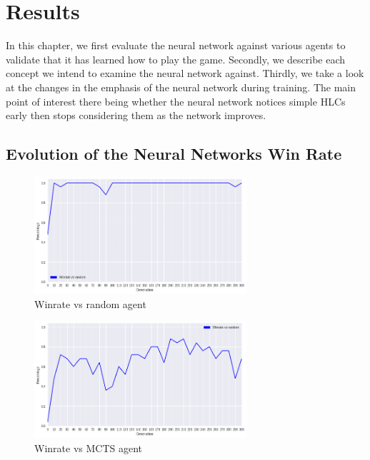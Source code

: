 \chapter{Results}

\label{cha:results}

In this chapter, we first evaluate the neural network against various agents to validate that it has learned how to play the game. Secondly, we describe each concept we intend to examine the neural network against. Thirdly, we take a look at the changes in the emphasis of the neural network during training. The main point of interest there being whether the neural network notices simple HLCs early then stops considering them as the network improves.

\section{Evolution of the Neural Networks Win Rate}

\begin{figure}
    \begin{small}
        \begin{center}
            \includegraphics[width=0.7\textwidth]{graphics/winratevsrandom.png}
        \end{center}
        \caption{Winrate vs random agent}
        \label{fig:winratevsrandom}
    \end{small}
\end{figure}

\begin{figure}
    \begin{small}
        \begin{center}
            \includegraphics[width=0.7\textwidth]{graphics/winratevsmcts.png}
        \end{center}
        \caption{Winrate vs MCTS agent}
        \label{fig:winratevsmcts}
    \end{small}
\end{figure}

